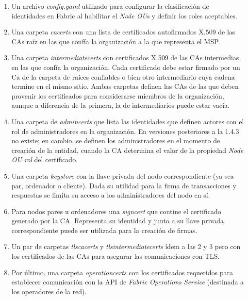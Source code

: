 \begin{enumerate}
	\item Un archivo \emph{config.yaml} utilizado para configurar la clasificaci\'on de identidades en Fabric al habilitar el \emph{Node OUs} y definir los roles aceptables.
	
	
	\item Una carpeta \emph{cacerts} con una lista de certificados autofirmados X.509 de las CAs ra\'iz en las que conf\'ia la organizaci\'on a la que representa el MSP.
	
	\item Una carpeta \emph{intermediatecerts} con certificados X.509 de las CAs intermedias en las que conf\'ia la organizaci\'on. Cada certificado debe estar firmado por un Ca de la carpeta de ra\'ices confiables o bien otro intermediario cuya cadena termine en el mismo sitio. Ambas carpetas definen las CAs de las que deben provenir los certificados para considerarse miembros de la organizaci\'on, aunque a diferencia de la primera, la de intermediarios puede estar vac\'ia.
	
	\item Una carpeta de \emph{admincerts} que lista las identidades que definen actores con el rol de administradores en la organizaci\'on. En versiones posteriores a la 1.4.3 no existe; en cambio, se definen los administradores en el momento de creaci\'on de la entidad, cuando la CA determina el valor de la propiedad \emph{Node OU rol} del certificado.
	
	
	\item Una carpeta \emph{keystore} con la llave privada del nodo correspondiente (ya sea par, ordenador o cliente). Dada su utilidad para la firma de transacciones y respuestas se limita su acceso a los administradores del nodo en s\'i. 
	
	\item Para nodos pares u ordenadores una \emph{signcert} que contine el certificado generado por la CA. Representa su identidad y junto a su llave privada correspondiente puede ser utilizada para la creaci\'on de firmas.
	
	\item Un par de carpetas \emph{tlscacerts} y \emph{tlsintermediatecerts} \'idem a las 2 y 3 pero con los certificados de las CAs para asegurar las comunicaciones con TLS.
	
	\item Por \'ultimo, una carpeta \emph{operationcerts} con los certificados requeridos para establecer comunicaci\'on con la API de \emph{Fabric Operations Service} (destinada a los operadores de la red).
\end{enumerate}

